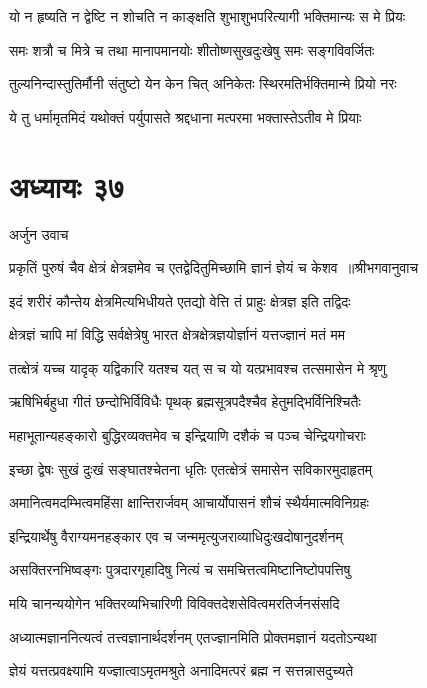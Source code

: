 \twolineshloka
{यो न हृष्यति न द्वेष्टि न शोचति न काङ्क्षति}
{शुभाशुभपरित्यागी भक्तिमान्यः स मे प्रियः}


\twolineshloka
{समः शत्रौ च मित्रे च तथा मानापमानयोः}
{शीतोष्णसुखदुःखेषु समः सङ्गविवर्जितः}


\twolineshloka
{तुल्यनिन्दास्तुतिर्मौनी संतुष्टो येन केन चित्}
{अनिकेतः स्थिरमतिर्भक्तिमान्मे प्रियो नरः}


\twolineshloka
{ये तु धर्मामृतमिदं यथोक्तं पर्युपासते}
{श्रद्दधाना मत्परमा भक्तास्तेऽतीव मे प्रियाः}


\chapter{अध्यायः ३७}
\twolineshloka
{अर्जुन उवाच}
{}


\threelineshloka
{प्रकृतिं पुरुषं चैव क्षेत्रं क्षेत्रज्ञमेव च}
{एतद्वेदितुमिच्छामि ज्ञानं ज्ञेयं च केशव ॥श्रीभगवानुवाच}
{}


\twolineshloka
{इदं शरीरं कौन्तेय क्षेत्रमित्यभिधीयते}
{एतद्यो वेत्ति तं प्राहुः क्षेत्रज्ञ इति तद्विदः}


\twolineshloka
{क्षेत्रज्ञं चापि मां विद्धि सर्वक्षेत्रेषु भारत}
{क्षेत्रक्षेत्रज्ञयोर्ज्ञानं यत्तज्ज्ञानं मतं मम}


\twolineshloka
{तत्क्षेत्रं यच्च यादृक् यद्विकारि यतश्च यत्}
{स च यो यत्प्रभावश्च तत्समासेन मे श्रृणु}


\twolineshloka
{ऋषिभिर्बहुधा गीतं छन्दोभिर्विविधैः पृथक्}
{ब्रह्मसूत्रपदैश्चैव हेतुमद्भिर्विनिश्चितैः}


\twolineshloka
{महाभूतान्यहङ्कारो बुद्धिरव्यक्तमेव च}
{इन्द्रियाणि दशैकं च पञ्च चेन्द्रियगोचराः}


\twolineshloka
{इच्छा द्वेषः सुखं दुःखं सङ्घातश्चेतना धृतिः}
{एतत्क्षेत्रं समासेन सविकारमुदाहृतम्}


\twolineshloka
{अमानित्वमदम्भित्वमहिंसा क्षान्तिरार्जवम्}
{आचार्योपासनं शौचं स्थैर्यमात्मविनिग्रहः}


\twolineshloka
{इन्द्रियार्थेषु वैराग्यमनहङ्कार एव च}
{जन्ममृत्युजराव्याधिदुःखदोषानुदर्शनम्}


\twolineshloka
{असक्तिरनभिष्वङ्गः पुत्रदारगृहादिषु}
{नित्यं च समचित्तत्वमिष्टानिष्टोपपत्तिषु}


\twolineshloka
{मयि चानन्ययोगेन भक्तिरव्यभिचारिणी}
{विविक्तदेशसेवित्वमरतिर्जनसंसदि}


\twolineshloka
{अध्यात्मज्ञाननित्यत्वं तत्त्वज्ञानार्थदर्शनम्}
{एतज्ज्ञानमिति प्रोक्तमज्ञानं यदतोऽन्यथा}


\twolineshloka
{ज्ञेयं यत्तत्प्रवक्ष्यामि यज्ज्ञात्वाऽमृतमश्रुते}
{अनादिमत्परं ब्रह्म न सत्तन्नासदुच्यते}


